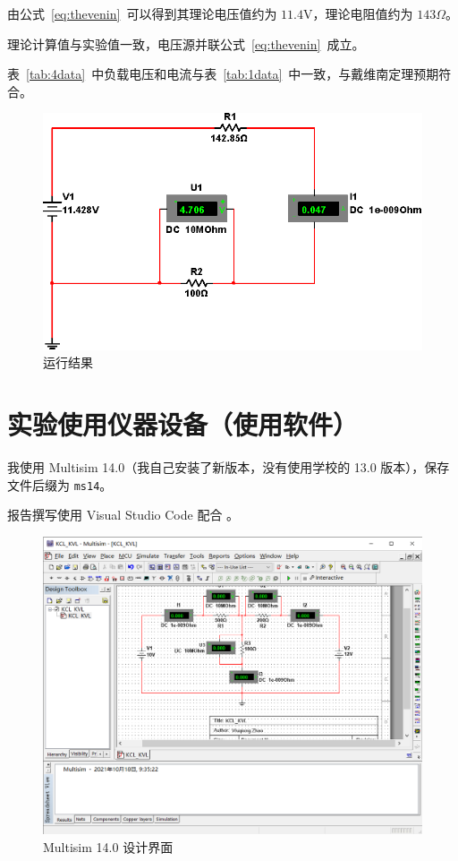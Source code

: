\documentclass[12pt]{SEU-Circuit-Report}
\begin{document}
            \expexpect

            由公式~\eqref{eq:thevenin}~可以得到其理论电压值约为 $11.4\mathrm{V}$，理论电阻值约为 $143\Omega$。

            \emptyline
            \expanalyze

            理论计算值与实验值一致，电压源并联公式~\eqref{eq:thevenin}~成立。

            表~\ref{tab:4data}~中负载电压和电流与表~\ref{tab:1data}~中一致，与戴维南定理预期符合。

            \newpage %
            \expsimulate

            \begin{figure}[htbp]
                \centering
                \includegraphics[width=.8\linewidth]{fig/exp5_result.eps}
                \caption{运行结果}
                \label{fig:5result}
            \end{figure}   

    \section{实验使用仪器设备（使用软件）}

        我使用 Multisim 14.0（我自己安装了新版本，没有使用学校的 13.0 版本），保存文件后缀为 \texttt{ms14}。

        报告撰写使用 Visual Studio Code 配合 \LaTeXe。

        \begin{figure}[htbp]
            \centering
            \includegraphics[width=.75\linewidth]{fig/Multisim_KCL_KVL_Design.png}
            \caption{Multisim 14.0 设计界面}
            \label{fig:multisim_design_window}
        \end{figure}
\end{document}
